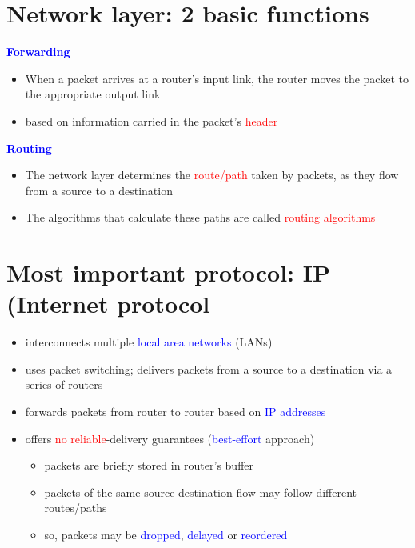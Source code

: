 \documentclass[11pt]{article}
\begin{document}
\section*{Network layer: 2 basic functions}

\textbf{\textcolor{blue}{Forwarding}}

\begin{itemize}
	\item When a packet arrives at a router's input link, the router moves the packet to the appropriate output link
	\item based on information carried in the packet's \textcolor{red}{header}
\end{itemize}

\textbf{\textcolor{blue}{Routing}}
\begin{itemize}
	\item The network layer determines the \textcolor{red}{route/path} taken by packets, as they flow from a source to a destination
	\item The algorithms that calculate these paths are called \textcolor{red}{routing algorithms}
\end{itemize}

\section*{Most important protocol: IP (Internet protocol}

\begin{itemize}
	\item interconnects multiple \textcolor{blue}{local area networks} (LANs)
	\item uses packet switching; delivers packets from a source to a destination via a series of routers
	\item forwards packets from router to router based on \textcolor{blue}{IP addresses}
	\item offers \textcolor{red}{no reliable}-delivery guarantees (\textcolor{blue}{best-effort} approach)
	\begin{itemize}
		\item packets are briefly stored in router's buffer
		\item packets of the same source-destination flow may follow different routes/paths
		\item so, packets may be \textcolor{blue}{dropped}, \textcolor{blue}{delayed} or \textcolor{blue}{reordered}
	\end{itemize}
	
\end{itemize}
\end{document}
